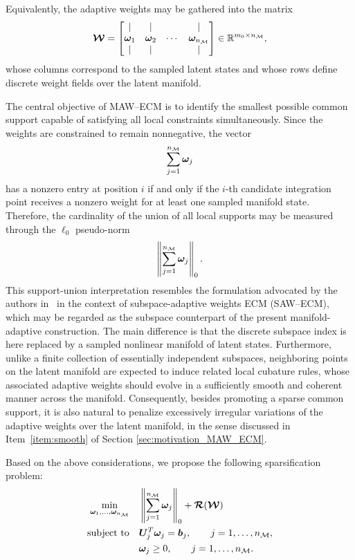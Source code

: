 \documentclass[11pt,a4paper]{article}
\begin{document}
Equivalently, the adaptive weights may be gathered into the matrix
\begin{equation}
\label{eq:3333333}
\boldsymbol{\mathcal{W}}
=
\begin{bmatrix}
| & | &  & | \\
\bm{\omega}_{1} & \bm{\omega}_{2} & \cdots & \bm{\omega}_{n_{\mathcal{M}}} \\
| & | &  & |
\end{bmatrix}
\in
\mathbb{R}^{m_0\times n_{\mathcal{M}}},
\end{equation}
whose columns correspond to the sampled latent states and whose rows define
discrete weight fields over the latent manifold.

The central objective of MAW--ECM is to identify the smallest possible common
support capable of satisfying all local constraints
simultaneously. Since the weights are constrained to remain nonnegative, the
vector
\[
\sum_{j=1}^{n_{\mathcal{M}}}\bm{\omega}_{j}
\]
has a nonzero entry at position \(i\) if and only if the \(i\)-th candidate
integration point receives a nonzero weight for at least one sampled manifold
state. Therefore,
the cardinality of the union of all local supports may be measured through the
\(\ell_0\) pseudo-norm
\begin{equation}
\label{eq:support1}
\left\|
\sum_{j=1}^{n_{\mathcal{M}}}
\bm{\omega}_{j}
\right\|_0 .
\end{equation}
This support-union interpretation resembles the formulation advocated
by the authors in~\cite{bravo2024subspace} in the context of subspace-adaptive
weights ECM (SAW--ECM), which may be regarded as the subspace counterpart of
the present manifold-adaptive construction. The main difference is that the
discrete subspace index is here replaced by a sampled nonlinear manifold of
latent states. Furthermore, unlike a finite collection of essentially
independent subspaces, neighboring points on the latent manifold are expected
to induce related local cubature rules, whose associated adaptive weights
should evolve in a sufficiently smooth and coherent manner across the manifold. Consequently, besides
promoting a sparse common support, it is also natural to penalize excessively
irregular variations of the adaptive weights over the latent manifold, in the
sense discussed in Item~\ref{item:smooth} of Section \ref{sec:motivation_MAW_ECM}.

Based on the above considerations, we propose the following
  sparsification problem:
\begin{equation}
\begin{aligned}
\min_{\bm{\omega}_{1},\ldots,\bm{\omega}_{n_{\mathcal{M}}}}
\quad &
\left\|
\sum_{j=1}^{n_{\mathcal{M}}}
\bm{\omega}_{j}
\right\|_0
+
 \boldsymbol{\mathcal{R}}(\boldsymbol{\mathcal{W}})
\\
\text{subject to}
\quad &
\bm{U}_{j}^{T}\bm{\omega}_{j}
=
\bm{b}_{j},
\qquad
j=1,\ldots,n_{\mathcal{M}},
\\
&
\bm{\omega}_{j}\ge0,
\qquad
j=1,\ldots,n_{\mathcal{M}} .
\end{aligned}
\label{eq:MAW_global_l0}
\end{equation}
\end{document}
